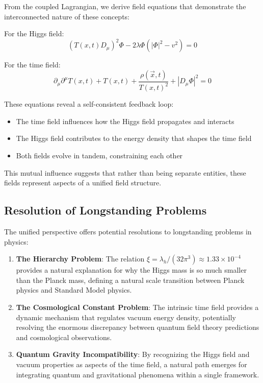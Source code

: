 \documentclass[12pt,a4paper]{article}
\newcommand{\Tfieldt}{T(x,t)}
\newcommand{\vecx}{\vec{x}}
\begin{document}
	From the coupled Lagrangian, we derive field equations that demonstrate the interconnected nature of these concepts:
	
	For the Higgs field:
	\begin{equation}
		(\Tfieldt D_\mu)^2 \Phi - 2\lambda\Phi(|\Phi|^2 - v^2) = 0
	\end{equation}
	
	For the time field:
	\begin{equation}
		\partial_\mu\partial^\mu\Tfieldt + \Tfieldt + \frac{\rho(\vecx,t)}{\Tfieldt^2} + |D_\mu\Phi|^2 = 0
	\end{equation}
	
	These equations reveal a self-consistent feedback loop:
	\begin{itemize}
		\item The time field influences how the Higgs field propagates and interacts
		\item The Higgs field contributes to the energy density that shapes the time field
		\item Both fields evolve in tandem, constraining each other
	\end{itemize}
	
	This mutual influence suggests that rather than being separate entities, these fields represent aspects of a unified field structure.
	
	\subsection{Resolution of Longstanding Problems}
	\label{subsec:resolution_problems}
	
	The unified perspective offers potential resolutions to longstanding problems in physics:
	
	\begin{enumerate}
		\item \textbf{The Hierarchy Problem}: The relation $\xi = \lambda_h/(32\pi^3) \approx 1.33 \times 10^{-4}$ provides a natural explanation for why the Higgs mass is so much smaller than the Planck mass, defining a natural scale transition between Planck physics and Standard Model physics.
		
		\item \textbf{The Cosmological Constant Problem}: The intrinsic time field provides a dynamic mechanism that regulates vacuum energy density, potentially resolving the enormous discrepancy between quantum field theory predictions and cosmological observations.
		
		\item \textbf{Quantum Gravity Incompatibility}: By recognizing the Higgs field and vacuum properties as aspects of the time field, a natural path emerges for integrating quantum and gravitational phenomena within a single framework.
	\end{enumerate}
	
\end{document}
